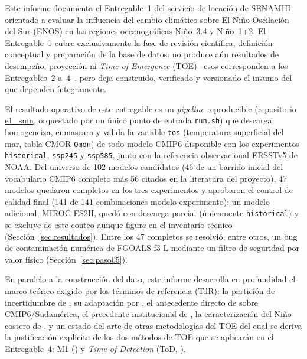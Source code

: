 \documentclass[11pt,a4paper]{article}
\newcommand{\archivo}[1]{\begingroup\hypersetup{urlcolor=black}\url{#1}\endgroup}
\begin{document}
Este informe documenta el Entregable~1 del servicio de locaci\'on de SENAMHI orientado a evaluar la influencia del cambio clim\'atico sobre El Ni\~no-Oscilaci\'on del Sur (ENOS) en las regiones oceanogr\'aficas Ni\~no~3.4 y Ni\~no~1+2. El Entregable~1 cubre exclusivamente la fase de revisi\'on cient\'ifica, definici\'on conceptual y preparaci\'on de la base de datos: no produce a\'un resultados de desempe\~no, proyecci\'on ni \emph{Time of Emergence} (TOE) --esos corresponden a los Entregables~2 a~4--, pero deja construido, verificado y versionado el insumo del que dependen \'integramente.

El resultado operativo de este entregable es un \emph{pipeline} reproducible (repositorio \archivo{e1_smn}, orquestado por un \'unico punto de entrada \texttt{run.sh}) que descarga, homogeneiza, enmascara y valida la variable \texttt{tos} (temperatura superficial del mar, tabla CMOR \texttt{Omon}) de todo modelo CMIP6 disponible con los experimentos \texttt{historical}, \texttt{ssp245} y \texttt{ssp585}, junto con la referencia observacional ERSSTv5 de NOAA. Del universo de 102 modelos candidatos (46 de un barrido inicial del vocabulario CMIP6 completo m\'as 56 citados en la literatura del proyecto), 47 modelos quedaron completos en los tres experimentos y aprobaron el control de calidad final (141 de 141 combinaciones modelo-experimento); un modelo adicional, MIROC-ES2H, qued\'o con descarga parcial (\'unicamente \texttt{historical}) y se excluye de este conteo aunque figure en el inventario t\'ecnico (Secci\'on~\ref{sec:resultados}). Entre los 47 completos se resolvi\'o, entre otros, un bug de contaminaci\'on num\'erica de FGOALS-f3-L mediante un filtro de seguridad por valor f\'isico (Secci\'on~\ref{sec:paso05}).

En paralelo a la construcci\'on del dato, este informe desarrolla en profundidad el marco te\'orico exigido por los t\'erminos de referencia (TdR): la partici\'on de incertidumbre de \citet{hawkins2012}, su adaptaci\'on por \citet{szabo2016}, el antecedente directo de \citet{bruno2023} sobre CMIP6/Sudam\'erica, el precedente institucional de \citet{alvarez2024}, la caracterizaci\'on del Ni\~no costero de \citet{takahashi2019}, y un estado del arte de otras metodolog\'ias del TOE del cual se deriva la justificaci\'on expl\'icita de los dos m\'etodos de TOE que se aplicar\'an en el Entregable~4: M1 (\citealp{szabo2016}) y \emph{Time of Detection} (ToD, \citealp{gopika2024}).
\end{document}

